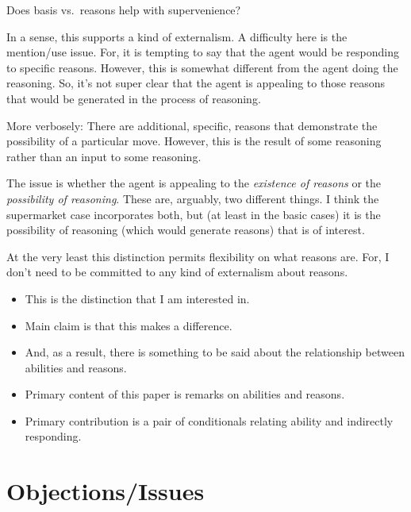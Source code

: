 \documentclass[10pt]{article}
\newcommand{\hozlinedash}[0]{%
  \noindent\hdashrule[0.5ex][c]{\textwidth}{.1pt}{2.5pt}
}
\begin{document}
\begin{note}
  Does basis vs.\ reasons help with supervenience?

  In a sense, this supports a kind of externalism.
  A difficulty here is the mention/use issue.
  For, it is tempting to say that the agent would be responding to specific reasons.
  However, this is somewhat different from the agent doing the reasoning.
  So, it's not super clear that the agent is appealing to those reasons that would be generated in the process of reasoning.

  More verbosely:
  There are additional, specific, reasons that demonstrate the possibility of a particular move.
  However, this is the result of some reasoning rather than an input to some reasoning.

  The issue is whether the agent is appealing to the \emph{existence of reasons} or the \emph{possibility of reasoning}.
  These are, arguably, two different things.
  I think the supermarket case incorporates both, but (at least in the basic cases) it is the possibility of reasoning (which would generate reasons) that is of interest.

  At the very least this distinction permits flexibility on what reasons are.
  For, I don't need to be committed to any kind of externalism about reasons.
\end{note}


\hozlinedash

\begin{itemize}
\item This is the distinction that I am interested in.
\item Main claim is that this makes a difference.
\item And, as a result, there is something to be said about the relationship between abilities and reasons.
\item Primary content of this paper is remarks on abilities and reasons.
\item Primary contribution is a pair of conditionals relating ability and indirectly responding.
\end{itemize}

\hozlinedash



\newpage


\section{Objections/Issues}
\label{sec:objectionsissues}
\end{document}

